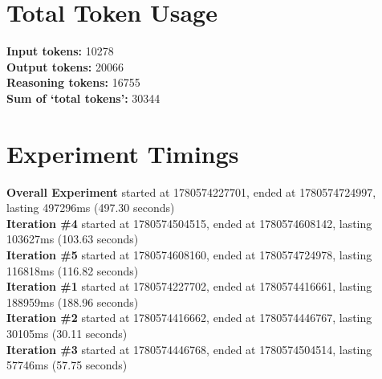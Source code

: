 \documentclass{article}
\begin{document}
\section*{Total Token Usage}
\textbf{Input tokens: }10278
\\\textbf{Output tokens: }20066
\\\textbf{Reasoning tokens: }16755
\\\textbf{Sum of `total tokens': }30344
\section*{Experiment Timings}
\textbf{Overall Experiment} started at 1780574227701, ended at 1780574724997, lasting 497296ms (497.30 seconds)
\\\textbf{Iteration \#4} started at 1780574504515, ended at 1780574608142, lasting 103627ms (103.63 seconds)
\\\textbf{Iteration \#5} started at 1780574608160, ended at 1780574724978, lasting 116818ms (116.82 seconds)
\\\textbf{Iteration \#1} started at 1780574227702, ended at 1780574416661, lasting 188959ms (188.96 seconds)
\\\textbf{Iteration \#2} started at 1780574416662, ended at 1780574446767, lasting 30105ms (30.11 seconds)
\\\textbf{Iteration \#3} started at 1780574446768, ended at 1780574504514, lasting 57746ms (57.75 seconds)
\end{document}
